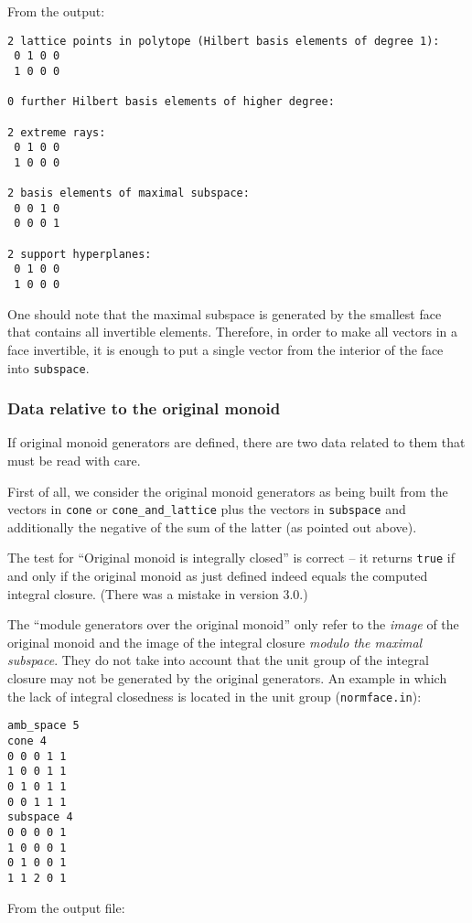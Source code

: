 \documentclass[12pt,a4paper]{scrartcl}
\theoremstyle{definition}
\begin{document}
{From the output:
\begin{Verbatim}
2 lattice points in polytope (Hilbert basis elements of degree 1):
 0 1 0 0
 1 0 0 0

0 further Hilbert basis elements of higher degree:

2 extreme rays:
 0 1 0 0
 1 0 0 0

2 basis elements of maximal subspace:
 0 0 1 0
 0 0 0 1

2 support hyperplanes:
 0 1 0 0
 1 0 0 0
\end{Verbatim}
 
One should note that the maximal subspace is generated by the smallest face that contains all invertible elements. Therefore, in order to make all vectors in a face invertible, it is enough to put a single vector from the interior of the face into \verb|subspace|.
 
\subsubsection{Data relative to the original monoid}

If original monoid generators are defined, there are two data related to them that must be read with care.

First of all, we consider the original monoid generators as being built from the vectors in \verb|cone| or \verb|cone_and_lattice| plus the vectors in \verb|subspace| and additionally the negative of the sum of the latter (as pointed out above). 

The test for ``Original monoid is integrally closed'' is correct -- it returns \verb|true| if and only if the original monoid as just defined indeed equals the computed integral closure. (There was a mistake in version 3.0.)

The ``module generators over the original monoid'' only refer to the \emph{image} of the original monoid and the image of the integral closure \emph{modulo the maximal subspace}. They do not take into account that the unit group of the integral closure may not be generated by the original generators. An example in which the lack of integral closedness is located in the unit group (\verb|normface.in|):

\begin{Verbatim}
amb_space 5
cone 4
0 0 0 1 1
1 0 0 1 1
0 1 0 1 1
0 0 1 1 1
subspace 4
0 0 0 0 1
1 0 0 0 1
0 1 0 0 1
1 1 2 0 1
\end{Verbatim}

From the output file:

}
\end{document}

